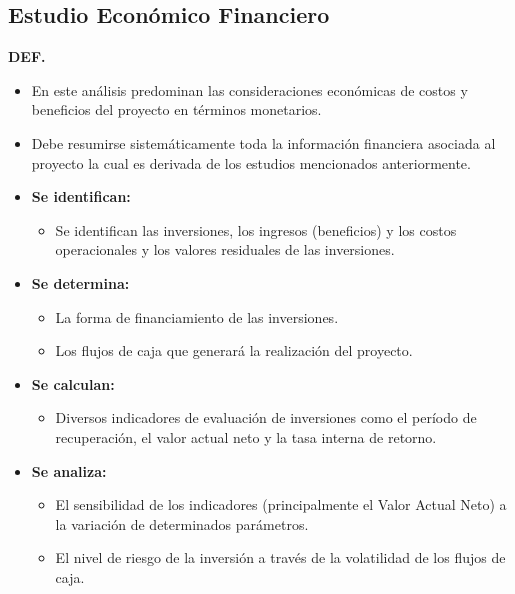 \documentclass{templateNote}
\begin{document}
\subsection{Estudio Económico Financiero}\hypertarget{EEF}{}
\textbf{DEF.}
\begin{itemize}
  \item En este an\'alisis predominan las consideraciones econ\'omicas de costos y beneficios del proyecto en t\'erminos monetarios.
  \item Debe resumirse sistemáticamente toda la información financiera asociada al proyecto la cual es derivada de los estudios mencionados anteriormente.
  \item \textbf{Se identifican:}
  \begin{itemize}
    \item Se identifican las inversiones, los ingresos (beneficios) y los costos operacionales y los valores residuales de las inversiones.
  \end{itemize}
  \item \textbf{Se determina:}
  \begin{itemize}
    \item La forma de financiamiento de las inversiones.
    \item Los flujos de caja que generará la realización del proyecto.
  \end{itemize}
  \item \textbf{Se calculan:}
  \begin{itemize}
    \item Diversos indicadores de evaluación de inversiones como el período de recuperación, el valor actual neto y la tasa interna de retorno.
  \end{itemize}
  \item \textbf{Se analiza:}
  \begin{itemize}
    \item El sensibilidad de los indicadores (principalmente el Valor Actual Neto) a la variación de determinados parámetros.
    \item El nivel de riesgo de la inversión a través de la volatilidad de los flujos de caja.
  \end{itemize}
\end{itemize}
\end{document}
